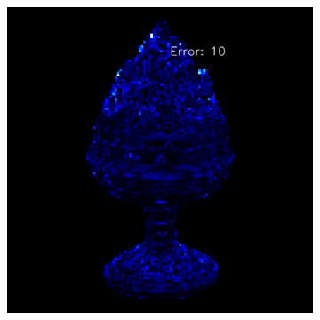 \begin{figure}
\begin{subfigure}[b]{0.24\linewidth}
	\end{subfigure}
	\begin{subfigure}[b]{0.24\linewidth}
		\includegraphics[width=\linewidth]{./Figures/gcnn_synthetic/fancy_eval_2_error_GCNN-GCNN.png}
	\end{subfigure}
	
	
	

\end{figure}
